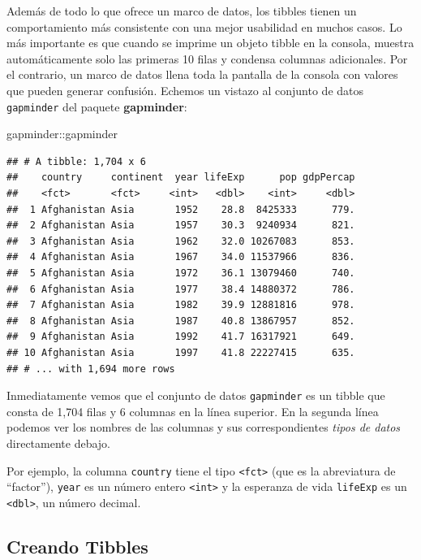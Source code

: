 \documentclass[
]{book}
\newenvironment{Shaded}{\begin{snugshade}}{\end{snugshade}}
\newcommand{\NormalTok}[1]{#1}
\newcommand{\SpecialCharTok}[1]{\textcolor[rgb]{0.00,0.00,0.00}{#1}}
\begin{document}
Además de todo lo que ofrece un marco de datos, los tibbles tienen un comportamiento más consistente con una mejor usabilidad en muchos casos. Lo más importante es que cuando se imprime un objeto tibble en la consola, muestra automáticamente solo las primeras 10 filas y condensa columnas adicionales. Por el contrario, un marco de datos llena toda la pantalla de la consola con valores que pueden generar confusión. Echemos un vistazo al conjunto de datos \texttt{gapminder} del paquete \textbf{gapminder}:

\begin{Shaded}
\begin{Highlighting}[]
\NormalTok{gapminder}\SpecialCharTok{::}\NormalTok{gapminder}
\end{Highlighting}
\end{Shaded}

\begin{verbatim}
## # A tibble: 1,704 x 6
##    country     continent  year lifeExp      pop gdpPercap
##    <fct>       <fct>     <int>   <dbl>    <int>     <dbl>
##  1 Afghanistan Asia       1952    28.8  8425333      779.
##  2 Afghanistan Asia       1957    30.3  9240934      821.
##  3 Afghanistan Asia       1962    32.0 10267083      853.
##  4 Afghanistan Asia       1967    34.0 11537966      836.
##  5 Afghanistan Asia       1972    36.1 13079460      740.
##  6 Afghanistan Asia       1977    38.4 14880372      786.
##  7 Afghanistan Asia       1982    39.9 12881816      978.
##  8 Afghanistan Asia       1987    40.8 13867957      852.
##  9 Afghanistan Asia       1992    41.7 16317921      649.
## 10 Afghanistan Asia       1997    41.8 22227415      635.
## # ... with 1,694 more rows
\end{verbatim}

Inmediatamente vemos que el conjunto de datos \texttt{gapminder} es un tibble que consta de 1,704 filas y 6 columnas en la línea superior. En la segunda línea podemos ver los nombres de las columnas y sus correspondientes \emph{tipos de datos} directamente debajo.

Por ejemplo, la columna \texttt{country} tiene el tipo \texttt{\textless{}fct\textgreater{}} (que es la abreviatura de ``factor''), \texttt{year} es un número entero \texttt{\textless{}int\textgreater{}} y la esperanza de vida \texttt{lifeExp} es un \texttt{\textless{}dbl\textgreater{}}, un número decimal.

\hypertarget{creando-tibbles}{%
\subsection{Creando Tibbles}\label{creando-tibbles}}
\end{document}
